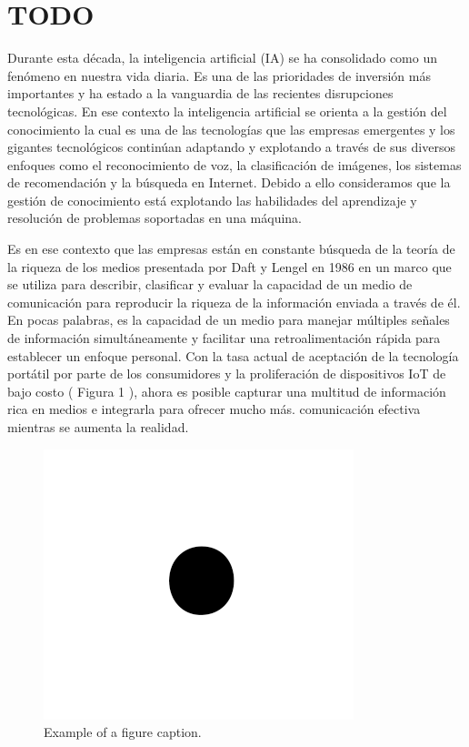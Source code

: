 \section{TODO}

Durante esta década, la inteligencia artificial (IA) se ha consolidado como un fenómeno en nuestra vida diaria. Es una de las prioridades de inversión más importantes y ha estado a la vanguardia de las recientes disrupciones tecnológicas. En ese contexto la inteligencia artificial se orienta a la gestión del conocimiento la cual es una de las tecnologías que las empresas emergentes y los gigantes tecnológicos continúan adaptando y explotando a través de sus diversos enfoques como el reconocimiento de voz, la clasificación de imágenes, los sistemas de recomendación y la búsqueda en Internet. Debido a ello consideramos que la gestión de conocimiento está explotando las habilidades del aprendizaje y resolución de problemas soportadas en una máquina.

Es en ese contexto que las empresas están en constante búsqueda de la teoría de la riqueza de los medios presentada por Daft y Lengel en 1986 en un marco que se utiliza para describir, clasificar y evaluar la capacidad de un medio de comunicación para reproducir la riqueza de la información enviada a través de él.  En pocas palabras, es la capacidad de un medio para manejar múltiples señales de información simultáneamente y facilitar una retroalimentación rápida para establecer un enfoque personal.  Con la tasa actual de aceptación de la tecnología portátil por parte de los consumidores  y la proliferación de dispositivos IoT de bajo costo ( Figura 1 ), ahora es posible capturar una multitud de información rica en medios e integrarla para ofrecer mucho más. comunicación efectiva mientras se aumenta la realidad.

\begin{figure}[htbp]
\centerline{\includegraphics{fig1.png}}
\caption{Example of a figure caption.}
\label{fig}
\end{figure}

